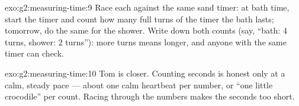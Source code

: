 \begin{solution}{exo:g2:measuring-time:9}
Race each against the same sand timer: at bath time, start the timer
and count how many full turns of the timer the bath lasts; tomorrow,
do the same for the shower. Write down both counts (say, ``bath: $4$
turns, shower: $2$ turns''): more turns means longer, and anyone with
the same timer can check.
\end{solution}

\begin{solution}{exo:g2:measuring-time:10}
Tom is closer. Counting seconds is honest only at a calm, steady
pace --- about one calm heartbeat per number, or ``one little
crocodile'' per count. Racing through the numbers makes the seconds
too short.
\end{solution}
